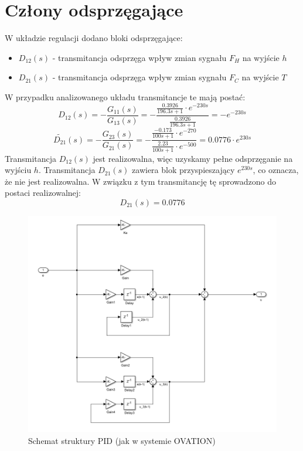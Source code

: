 \documentclass{article}
\begin{document}
\section{Człony odsprzęgające}
\label{sec::czlony_odsprzegajace}
W układzie regulacji dodano bloki odsprzęgające:
\begin{itemize}
	\item $D_{12}(s)$ - transmitancja odsprzęga wpływ zmian sygnału $F_H$ na wyjście $h$
	\item $D_{21}(s)$ - transmitancja odsprzęga wpływ zmian sygnału $F_C$ na wyjście $T$
\end{itemize}
W przypadku analizowanego układu transmitancje te mają postać:
\[
D_{12}(s) = -\frac{G_{11}(s)}{G_{13}(s)} = -\frac{\frac{0.3926}{196.3s+1}\cdot e^{-230s}}{\frac{0.3926}{196.3s+1}} =  -e^{-230s}
\]
\[
\widetilde{D_{21}}(s) = -\frac{G_{23}(s)}{G_{21}(s)} = -\frac{\frac{-0.173}{100s+1}\cdot e^{-270}}{\frac{2.23}{100s+1}\cdot e^{-500}} = 0.0776\cdot e^{230s}
\]
Transmitancja $D_{12}(s)$ jest realizowalna, więc uzyskamy pełne odsprzęganie na wyjściu $h$. Transmitancja $D_{21}(s)$ zawiera blok przyspieszający $e^{230s}$, co oznacza, że nie jest realizowalna. W związku z tym transmitancję tę sprowadzono do postaci realizowalnej:
\[
D_{21}(s) = 0.0776
\]
\begin{figure}[!htb]
	\centering
	\includegraphics[width=1\textwidth]{pid_ovation_schemat.PNG}
	\caption{Schemat struktury PID (jak w systemie OVATION)}
	\label{fig::pid_ovation_schemat}
\end{figure}
\end{document}

